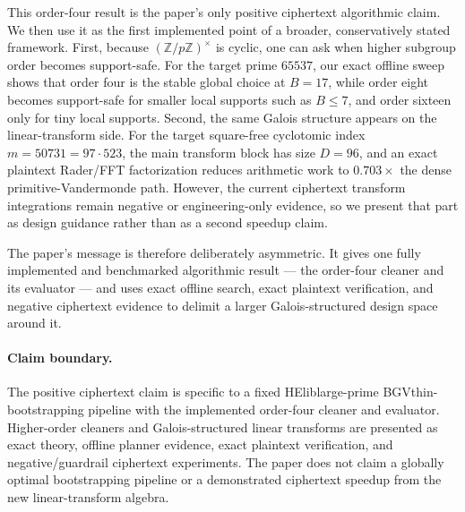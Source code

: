 \documentclass[a4paper,runningheads]{llncs}
\newcommand{\HElib}{\textsf{HElib}}
\newcommand{\BGV}{\textsf{BGV}}
\begin{document}
This order-four result is the paper's only positive ciphertext algorithmic claim. We then use it as the first implemented point of a broader, conservatively stated framework. First, because $(\mathbb{Z}/p\mathbb{Z})^\times$ is cyclic, one can ask when higher subgroup order becomes support-safe. For the target prime $65537$, our exact offline sweep shows that order four is the stable global choice at $B=17$, while order eight becomes support-safe for smaller local supports such as $B\le7$, and order sixteen only for tiny local supports. Second, the same Galois structure appears on the linear-transform side. For the target square-free cyclotomic index $m=50731=97\cdot523$, the main transform block has size $D=96$, and an exact plaintext Rader/FFT factorization reduces arithmetic work to $0.703\times$ the dense primitive-Vandermonde path. However, the current ciphertext transform integrations remain negative or engineering-only evidence, so we present that part as design guidance rather than as a second speedup claim.

The paper's message is therefore deliberately asymmetric. It gives one fully implemented and benchmarked algorithmic result --- the order-four cleaner and its evaluator --- and uses exact offline search, exact plaintext verification, and negative ciphertext evidence to delimit a larger Galois-structured design space around it.

\paragraph{Claim boundary.}
The positive ciphertext claim is specific to a fixed \HElib large-prime \BGV thin-bootstrapping pipeline with the implemented order-four cleaner and evaluator. Higher-order cleaners and Galois-structured linear transforms are presented as exact theory, offline planner evidence, exact plaintext verification, and negative/guardrail ciphertext experiments. The paper does not claim a globally optimal bootstrapping pipeline or a demonstrated ciphertext speedup from the new linear-transform algebra.
\end{document}
